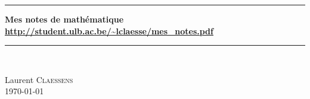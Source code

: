 
\thispagestyle{empty}
\begin{center}
  \begin{minipage}{15cm}
    \hrule\par
    \vspace{2mm}
    \begin{center}
    \Huge \bfseries Mes notes de mathématique \\        %
    \normalsize
    \url{http://student.ulb.ac.be/~lclaesse/mes_notes.pdf}
    \end{center}
    \hrule\par
  \end{minipage}\\
  \vspace{0.2cm}
\end{center}

\vspace{2cm}

\begin{center}
    Laurent \textsc{Claessens}\\
    \today

    \vspace{1cm}

\end{center}

\vfill

\LogoEtLicence



